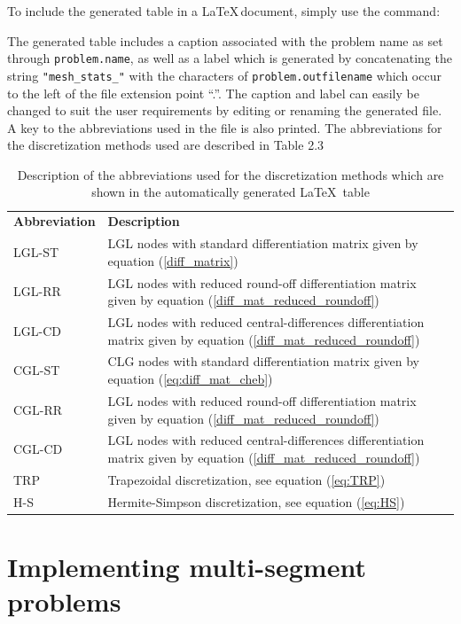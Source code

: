 \documentclass[a4paper,11pt]{report}    %
\begin{document}
To include the generated table in a \LaTeX \,document, simply use the command:

\verb||

The generated table includes a caption associated with the problem name as set through \verb|problem.name|, as well as a label
which is generated by concatenating the string \verb|"mesh_stats_"| with the characters of \verb|problem.outfilename| which occur 
to the left of the file extension point ``.''. The caption
and label can easily be changed to suit the user requirements by editing or renaming the generated file. A key to the
abbreviations used in the file is also printed. The abbreviations for the discretization methods used are described in Table 2.3

\begin{table}
\label{tab:methods_used}
 \begin{tabular}{lp{8cm}} 
  \textbf{Abbreviation} & \textbf{Description}   \\
  LGL-ST       & LGL nodes with standard differentiation matrix given by equation (\ref{diff_matrix}) \\
  LGL-RR       & LGL nodes with reduced round-off differentiation matrix given by equation (\ref{diff_mat_reduced_roundoff}) \\
  LGL-CD       & LGL nodes with reduced central-differences differentiation matrix given by equation (\ref{diff_mat_reduced_roundoff}) \\
  CGL-ST       & CLG nodes with standard differentiation matrix given by equation (\ref{eq:diff_mat_cheb}) \\
  CGL-RR       & LGL nodes with reduced round-off differentiation matrix given by equation (\ref{diff_mat_reduced_roundoff}) \\
  CGL-CD       & LGL nodes with reduced central-differences differentiation matrix given by equation (\ref{diff_mat_reduced_roundoff}) \\
  TRP          & Trapezoidal discretization, see equation (\ref{eq:TRP}) \\
  H-S          & Hermite-Simpson discretization, see equation (\ref{eq:HS})
 \end{tabular}
\caption{Description of the abbreviations used for the discretization methods which are shown in the automatically generated \LaTeX \, table}
\end{table}


\section{Implementing multi-segment problems}
\end{document}
